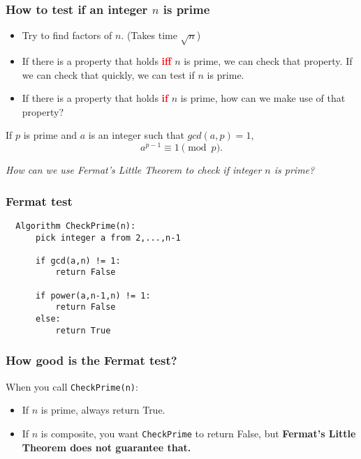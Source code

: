 \begin{frame}
  \frametitle{How to test if an integer $n$ is prime}

  \begin{itemize}
  \item Try to find factors of $n$.  (Takes time $\sqrt{n}$)
    \pause
  \item If there is a property that holds \textcolor{red}{\bf iff} $n$
    is prime, we can check that property.  If we can check that
    quickly, we can test if $n$ is prime.
    \pause
  \item If there is a property that holds \textcolor{red}{\bf if} $n$
    is prime, how can we make use of that property?
  \end{itemize}
\end{frame}

\begin{frame}
  \begin{theorem}
    If $p$ is prime and $a$ is an integer such that $gcd(a,p)=1$,
    \[
    a^{p-1}\equiv 1 \pmod p.
    \]
  \end{theorem}

  \pause

  \vspace{0.2in}

  {\em How can we use Fermat's Little Theorem to check if integer $n$
    is prime?}
\end{frame}

\begin{frame}[fragile]
  \frametitle{Fermat test}

  \begin{tcolorbox}
  {\small
\begin{verbatim}
  Algorithm CheckPrime(n):
      pick integer a from 2,...,n-1

      if gcd(a,n) != 1:
          return False

      if power(a,n-1,n) != 1:
          return False
      else:
          return True
\end{verbatim}
  }
  \end{tcolorbox}
  
\end{frame}

\begin{frame}
  \frametitle{How good is the Fermat test?}

  When you call {\tt CheckPrime(n)}:

  \begin{itemize}
  \item If $n$ is prime,  always return True.
  \item If $n$ is composite, \pause you want {\tt CheckPrime} to
    return False, but {\bf Fermat's Little Theorem does not guarantee that.}
  \end{itemize}
\end{frame}

